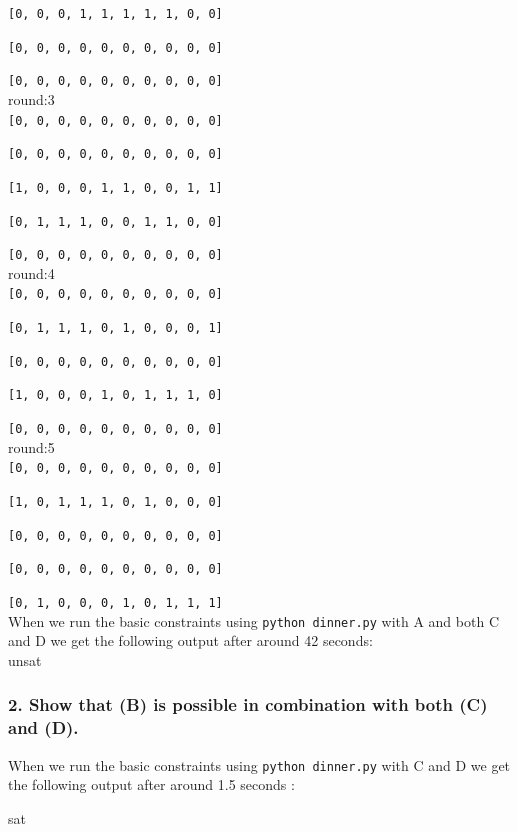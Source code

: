 \documentclass[12pt]{article}
\begin{document}
{\tt [0, 0, 0, 1, 1, 1, 1, 1, 0, 0]}

{\tt [0, 0, 0, 0, 0, 0, 0, 0, 0, 0]}

{\tt [0, 0, 0, 0, 0, 0, 0, 0, 0, 0]}\\

round:3\\

{\tt [0, 0, 0, 0, 0, 0, 0, 0, 0, 0]}

{\tt [0, 0, 0, 0, 0, 0, 0, 0, 0, 0]}

{\tt [1, 0, 0, 0, 1, 1, 0, 0, 1, 1]}

{\tt [0, 1, 1, 1, 0, 0, 1, 1, 0, 0]}

{\tt [0, 0, 0, 0, 0, 0, 0, 0, 0, 0]}\\

round:4\\

{\tt [0, 0, 0, 0, 0, 0, 0, 0, 0, 0]}

{\tt [0, 1, 1, 1, 0, 1, 0, 0, 0, 1]}

{\tt [0, 0, 0, 0, 0, 0, 0, 0, 0, 0]}

{\tt [1, 0, 0, 0, 1, 0, 1, 1, 1, 0]}

{\tt [0, 0, 0, 0, 0, 0, 0, 0, 0, 0]}\\

round:5\\

{\tt [0, 0, 0, 0, 0, 0, 0, 0, 0, 0]}

{\tt [1, 0, 1, 1, 1, 0, 1, 0, 0, 0]}

{\tt [0, 0, 0, 0, 0, 0, 0, 0, 0, 0]}

{\tt [0, 0, 0, 0, 0, 0, 0, 0, 0, 0]}

{\tt [0, 1, 0, 0, 0, 1, 0, 1, 1, 1]}\\

When we run the basic constraints using {\tt python dinner.py} with A and both C and D we get the following output after around 42 seconds:\\

unsat

\subsubsection*{2. Show that (B) is possible in combination with both (C) and (D).}

When we run the basic constraints using {\tt python dinner.py} with C and D we get the following output after around 1.5 seconds :

sat\\
\end{document}
